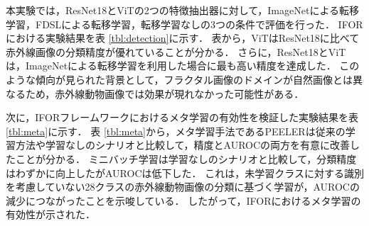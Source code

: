 \documentclass[uplatex,dvipdfmx,10pt,twocolumn]{jsarticle}
\begin{document}
本実験では，ResNet18とViTの2つの特徴抽出器に対して，ImageNetによる転移学習，FDSLによる転移学習，転移学習なしの3つの条件で評価を行った．
IFORにおける実験結果を表 \ref{tbl:detection}に示す．
表から，ViTはResNet18に比べて赤外線画像の分類精度が優れていることが分かる．
さらに，ResNet18とViTは，ImageNetによる転移学習を利用した場合に最も高い精度を達成した．
このような傾向が見られた背景として，フラクタル画像のドメインが自然画像とは異なるため，赤外線動物画像では効果が現れなかった可能性がある．

次に，IFORフレームワークにおけるメタ学習の有効性を検証した実験結果を表 \ref{tbl:meta}に示す．
表 \ref{tbl:meta}から，メタ学習手法であるPEELERは従来の学習方法や学習なしのシナリオと比較して，精度とAUROCの両方を有意に改善したことが分かる．
ミニバッチ学習は学習なしのシナリオと比較して，分類精度はわずかに向上したがAUROCは低下した．
これは，未学習クラスに対する識別を考慮していない28クラスの赤外線動物画像の分類に基づく学習が，AUROCの減少につながったことを示唆している．
したがって，IFORにおけるメタ学習の有効性が示された．
\end{document}
